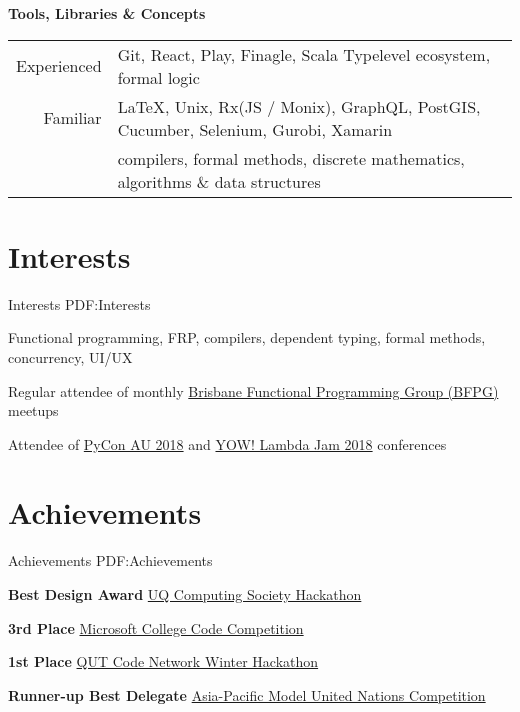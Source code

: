 \documentclass[a4paper,10pt,oneside]{article}
\begin{document}
\begin{body}
\EntryGap
\EntryGap
\EntryGap

\textbf{Tools, Libraries \& Concepts}

\par
\begin{tabular}{rl}
\par Experienced & Git, React, Play, Finagle, Scala Typelevel ecosystem, formal logic\\
\par Familiar & \LaTeX, Unix, Rx(JS / Monix), GraphQL, PostGIS, Cucumber, Selenium, Gurobi, Xamarin\\
& compilers, formal methods, discrete mathematics, algorithms \& data structures\\
\end{tabular}

\section
{Interests}
{Interests}
{PDF:Interests}

\par Functional programming, FRP, compilers, dependent typing, formal methods, concurrency, UI/UX
\par Regular attendee of monthly \href{https://www.meetup.com/en-AU/Brisbane-Functional-Programming-Group/}{Brisbane Functional Programming Group (BFPG)} meetups
\par Attendee of \href{https://2018.pycon-au.org/}{PyCon AU 2018} and \href{http://lambdajam.yowconference.com.au/}
{YOW! Lambda Jam 2018} conferences


\section
{Achievements}
{Achievements}
{PDF:Achievements}

\par \textbf{Best Design Award}
\href{https://uqcs.org.au/}{UQ Computing Society Hackathon}
\hfill {}

\par \textbf{3rd Place}
\href{https://msft3c.com/}{Microsoft College Code Competition}
\hfill {}

\par \textbf{1st Place}
\href{https://codenetwork.co/hackathon-2017/}{QUT Code Network Winter Hackathon}
\hfill {}

\par \textbf{Runner-up Best Delegate}
\href{http://www.amunc.net/}{Asia-Pacific Model United Nations Competition} 
\hfill {}


\end{body}
\end{document}
